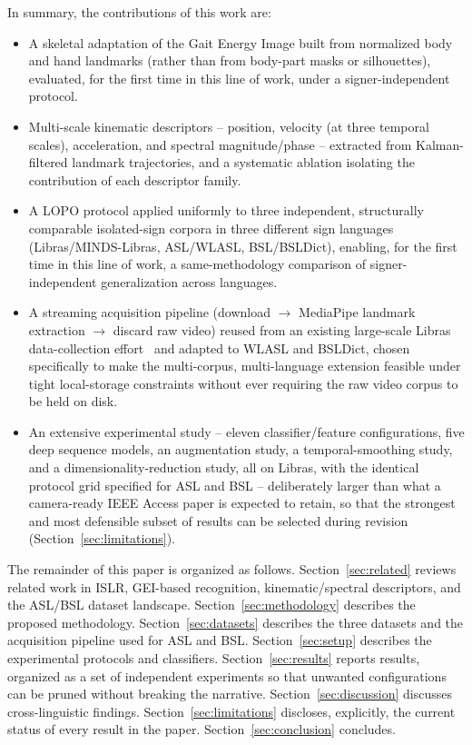 \documentclass[journal]{IEEEtran}
\begin{document}
In summary, the contributions of this work are:
\begin{itemize}
\item A skeletal adaptation of the Gait Energy Image built from normalized body and hand landmarks (rather than from body-part masks or silhouettes), evaluated, for the first time in this line of work, under a signer-independent protocol.
\item Multi-scale kinematic descriptors -- position, velocity (at three temporal scales), acceleration, and spectral magnitude/phase -- extracted from Kalman-filtered landmark trajectories, and a systematic ablation isolating the contribution of each descriptor family.
\item A LOPO protocol applied uniformly to three independent, structurally comparable isolated-sign corpora in three different sign languages (Libras/MINDS-Libras, ASL/WLASL, BSL/BSLDict), enabling, for the first time in this line of work, a same-methodology comparison of signer-independent generalization across languages.
\item A streaming acquisition pipeline (download $\rightarrow$ MediaPipe landmark extraction $\rightarrow$ discard raw video) reused from an existing large-scale Libras data-collection effort~\cite{lugaresi2019mediapipe} and adapted to WLASL and BSLDict, chosen specifically to make the multi-corpus, multi-language extension feasible under tight local-storage constraints without ever requiring the raw video corpus to be held on disk.
\item An extensive experimental study -- eleven classifier/feature configurations, five deep sequence models, an augmentation study, a temporal-smoothing study, and a dimensionality-reduction study, all on Libras, with the identical protocol grid specified for ASL and BSL -- deliberately larger than what a camera-ready IEEE Access paper is expected to retain, so that the strongest and most defensible subset of results can be selected during revision (Section~\ref{sec:limitations}).
\end{itemize}

The remainder of this paper is organized as follows. Section~\ref{sec:related} reviews related work in ISLR, GEI-based recognition, kinematic/spectral descriptors, and the ASL/BSL dataset landscape. Section~\ref{sec:methodology} describes the proposed methodology. Section~\ref{sec:datasets} describes the three datasets and the acquisition pipeline used for ASL and BSL. Section~\ref{sec:setup} describes the experimental protocols and classifiers. Section~\ref{sec:results} reports results, organized as a set of independent experiments so that unwanted configurations can be pruned without breaking the narrative. Section~\ref{sec:discussion} discusses cross-linguistic findings. Section~\ref{sec:limitations} discloses, explicitly, the current status of every result in the paper. Section~\ref{sec:conclusion} concludes.
\end{document}
